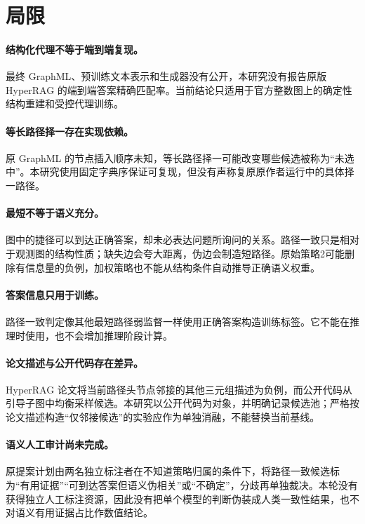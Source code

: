 \documentclass[UTF8,11pt]{ctexart}
\begin{document}
\section{局限}

\paragraph{结构化代理不等于端到端复现。}
最终 GraphML、预训练文本表示和生成器没有公开，本研究没有报告原版 HyperRAG 的端到端答案精确匹配率。当前结论只适用于官方整数图上的确定性结构重建和受控代理训练。

\paragraph{等长路径择一存在实现依赖。}
原 GraphML 的节点插入顺序未知，等长路径择一可能改变哪些候选被称为“未选中”。本研究使用固定字典序保证可复现，但没有声称复原原作者运行中的具体择一路径。

\paragraph{最短不等于语义充分。}
图中的捷径可以到达正确答案，却未必表达问题所询问的关系。路径一致只是相对于观测图的结构性质；缺失边会夸大距离，伪边会制造短路径。原始策略2可能删除有信息量的负例，加权策略也不能从结构条件自动推导正确语义权重。

\paragraph{答案信息只用于训练。}
路径一致判定像其他最短路径弱监督一样使用正确答案构造训练标签。它不能在推理时使用，也不会增加推理阶段计算。

\paragraph{论文描述与公开代码存在差异。}
HyperRAG 论文将当前路径头节点邻接的其他三元组描述为负例，而公开代码从引导子图中均衡采样候选。本研究以公开代码为对象，并明确记录候选池；严格按论文描述构造“仅邻接候选”的实验应作为单独消融，不能替换当前基线。

\paragraph{语义人工审计尚未完成。}
原提案计划由两名独立标注者在不知道策略归属的条件下，将路径一致候选标为“有用证据”“可到达答案但语义伪相关”或“不确定”，分歧再单独裁决。本轮没有获得独立人工标注资源，因此没有把单个模型的判断伪装成人类一致性结果，也不对语义有用证据占比作数值结论。
\end{document}
